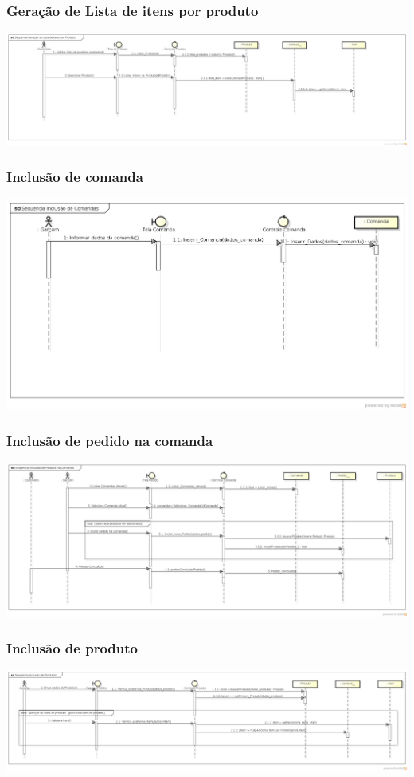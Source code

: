 \newpage
\subsubsection{Geração de Lista de itens por produto}
\centerline{
\includegraphics[scale=0.30,angle=90]{diagrama/sequencia_geracao_de_lista_de_itens_por_produto.png}
}

\newpage
\subsubsection{Inclusão de comanda}
\centerline{
\includegraphics[scale=0.49,angle=90]{diagrama/sequencia_inclusao_de_comandas.png}
}


\newpage
\subsubsection{Inclusão de pedido na comanda}
\centerline{
\includegraphics[scale=0.35,angle=90]{diagrama/Sequencia_Inclusao_de_Pedidos_na_Comanda.png}
}
\newpage
\subsubsection{Inclusão de produto}
\centerline{
\includegraphics[scale=0.30,angle=90]{diagrama/Sequencia_Inclusao_de_Produtos.png}
}


